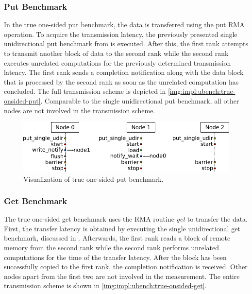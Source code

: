 \subsubsection*{Put Benchmark}

In the true one-sided put benchmark, the data is transferred using the put \ac{RMA} operation. To acquire the transmission latency, the previously presented single unidirectional put benchmark from  is executed. After this, the first rank attempts to transmit another block of data to the second rank while the second rank executes unrelated computations for the previously determined transmission latency. The first rank sends a completion notification along with the data block that is processed by the second rank as soon as the unrelated computation has concluded. The full transmission scheme is depicted in \autoref{img:impl:ubench:true-onsided-put}. Comparable to the single unidirectional put benchmark, all other nodes are not involved in the transmission scheme.

\begin{figure}[htb]
\centering
\includegraphics[width=\textwidth]{img/bench-true-one-sided-put}
\caption{Visualization of true one-sided put benchmark.}
\label{img:impl:ubench:true-onsided-put}
\end{figure}


\subsubsection*{Get Benchmark}

The true one-sided get benchmark uses the \ac{RMA} routine \emph{get} to transfer the data. First, the transfer latency is obtained by executing the single unidirectional get benchmark, discussed in . Afterwards, the first rank reads a block of remote memory from the second rank while the second rank performs unrelated computations for the time of the transfer latency. After the block has been successfully copied to the first rank, the completion notification is received. Other nodes apart from the first two are not involved in the measurement. The entire transmission scheme is shown in \autoref{img:impl:ubench:true-onsided-get}.

